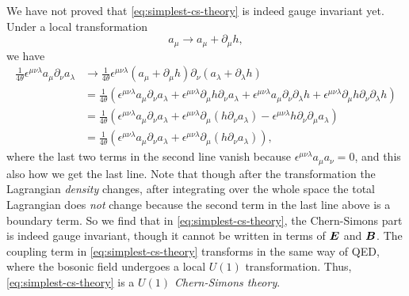 \documentclass[hyperref, a4paper]{article}
\begin{document}
We have not proved that \eqref{eq:simplest-cs-theory} is indeed gauge invariant yet. Under a local transformation
\[
    a_\mu \longrightarrow a_\mu + \partial_\mu h,
\]
we have
\[
    \begin{aligned}
        \frac{1}{4\theta} \epsilon^{\mu \nu \lambda} a_\mu \partial_\nu a_\lambda &\longrightarrow 
        \frac{1}{4\theta} \epsilon^{\mu \nu \lambda} (a_\mu + \partial_\mu h) \partial_\nu (a_\lambda + \partial_\lambda h) \\
        &= \frac{1}{4 \theta} (\epsilon^{\mu \nu \lambda} a_\mu \partial_\nu a_\lambda 
        + \epsilon^{\mu \nu \lambda} \partial_\mu h \partial_\nu a_\lambda
        + \epsilon^{\mu \nu \lambda} a_\mu \partial_\nu \partial_\lambda h
        + \epsilon^{\mu \nu \lambda} \partial_\mu h \partial_\nu \partial_\lambda h) \\
        &= \frac{1}{4 \theta} (\epsilon^{\mu \nu \lambda} a_\mu \partial_\nu a_\lambda 
        + \epsilon^{\mu \nu \lambda} \partial_\mu( h \partial_\nu a_\lambda) 
        - \epsilon^{\mu \nu \lambda} h \partial_\nu \partial_\mu a_\lambda ) \\
        &= \frac{1}{4 \theta} (\epsilon^{\mu \nu \lambda} a_\mu \partial_\nu a_\lambda 
        + \epsilon^{\mu \nu \lambda} \partial_\mu( h \partial_\nu a_\lambda)),
    \end{aligned}
\]
where the last two terms in the second line vanish because $\epsilon^{\mu \nu \lambda} a_\mu a_\nu = 0$, and 
this also how we get the last line. Note that though after the transformation the Lagrangian \emph{density}
changes, after integrating over the whole space the total Lagrangian does \emph{not} change because the second 
term in the last line above is a boundary term. So we find that in \eqref{eq:simplest-cs-theory}, the 
Chern-Simons part is indeed gauge invariant, though it cannot be written in terms of $\vb*{E}$ and $\vb*{B}$.
The coupling term in \eqref{eq:simplest-cs-theory} transforms in the same way of QED, where the bosonic 
field undergoes a local $U(1)$ transformation. Thus, \eqref{eq:simplest-cs-theory} is a 
\emph{$U(1)$ Chern-Simons theory}.
\end{document}
